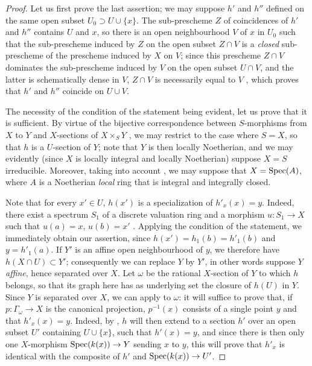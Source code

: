 \begin{proof}
Let us first prove the last assertion; we may suppose $h'$ and $h''$ defined on the same open subset $U_0\supset U\cup\{x\}$.
The sub-prescheme $Z$ of coincidences of $h'$ and $h''$  contains $U$ and $x$, so there is an open neighbourhood $V$ of $x$ in $U_0$ such that the sub-prescheme induced by $Z$ on the open subset $Z\cap V$ is a \emph{closed} sub-prescheme of the prescheme induced by $X$ on $V$; since this prescheme $Z\cap V$ dominates the sub-prescheme induced by $V$ on the open subset $U\cap V$, and the latter is schematically dense in $V$, $Z\cap V$ is necessarily equal to $V$ , which proves that $h'$ and $h''$ coincide on $U\cup V$.

The necessity of the condition of the statement being evident, let us prove that it is sufficient.
By virtue of the bijective correspondence between $S$-morphisms from $X$ to $Y$ and $X$-sections of $X\times_S Y$ , we may restrict to the case where $S=X$, so that $h$ is a $U$-section of $Y$; note that $Y$ is then locally Noetherian, and we may evidently (since $X$ is locally integral and locally Noetherian) suppose $X=S$ irreducible.
Moreover, taking into account , we may suppose that $X=\operatorname{Spec}(A)$, where $A$ is a Noetherian \emph{local} ring that is integral and integrally closed.

Note that for every $x'\in U$, $h(x')$ is a specialization of $h'_x(x)=y$.
Indeed, there exist a spectrum $S_1$ of a discrete valuation ring and a morphism $u:S_1\to X$ such that $u(a)=x$, $u(b)=x'$ .
Applying the condition of the statement, we immediately obtain our assertion, since $h(x')=h_1(b)=h'_1(b)$ and $y=h'_1(a)$.
If $Y'$ is an affine open neighbourhood of $y$, we therefore have $h(X\cap U)\subset Y'$; consequently we can replace $Y$ by $Y'$, in other words suppose $Y$ \emph{affine}, hence separated over $X$.
Let $\omega$ be the rational $X$-section of $Y$ to which $h$ belongs, so that its graph here has as underlying set the closure of $h(U)$ in $Y$.
Since $Y$ is separated over $X$, we can apply  to $\omega$: it will suffice to prove that, if $p:\Gamma_\omega\to X$ is the canonical projection, $p^{-1}(x)$ consists of a single point $y$ and that $h'_x(x)=y$.
Indeed, by , $h$ will then extend to a section $h'$ over an open subset $U'$ containing $U\cup\{x\}$, such that $h'(x)=y$, and since there is then only one $X$-morphism $\operatorname{Spec}(k(x))\to Y$ sending $x$ to $y$, this will prove that $h'_x$ is identical with the composite of $h'$ and $\operatorname{Spec}(k(x))\to U'$.


\end{proof}

